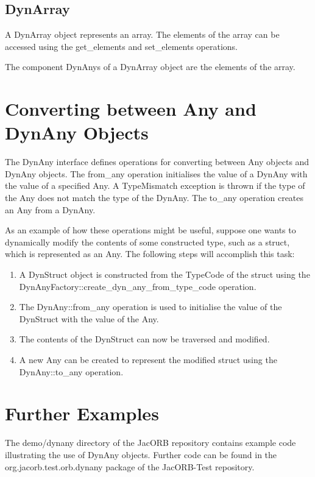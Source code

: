 \subsection{DynArray}

A DynArray object represents an array.  The elements of the array can
be accessed using the get\_elements and set\_elements operations.

The component DynAnys of a DynArray object are the elements of the
array.

\section{Converting between Any and DynAny Objects}

The DynAny interface defines operations for converting between Any
objects and DynAny objects.  The from\_any operation initialises the
value of a DynAny with the value of a specified Any.  A TypeMismatch
exception is thrown if the type of the Any does not match the type of
the DynAny.  The to\_any operation creates an Any from a DynAny.

As an example of how these operations might be useful, suppose one
wants to dynamically modify the contents of some constructed type,
such as a struct, which is represented as an Any.  The following
steps will accomplish this task:

\begin{enumerate}
  \item  A DynStruct object is constructed from the TypeCode of the struct using the DynAnyFactory::create\_dyn\_any\_from\_type\_code operation.
  \item  The DynAny::from\_any operation is used to initialise the value of the DynStruct with the value of the Any.
  \item  The contents of the DynStruct can now be traversed and modified.
  \item  A new Any can be created to represent the modified struct using the DynAny::to\_any operation.
\end{enumerate}

\section{Further Examples}

The demo/dynany directory of the JacORB repository contains example
code illustrating the use of DynAny objects.  Further code can be
found in the org.jacorb.test.orb.dynany package of the JacORB-Test
repository.


